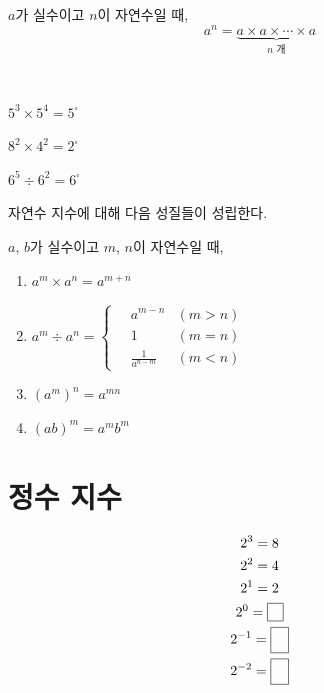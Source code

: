 \documentclass{oblivoir}
\begin{document}
\begin{mdframed}
%
\label{natural2}
\(a\)가 실수이고 \(n\)이 자연수일 때,
\[a^n=\underbrace{a\times a\times\cdots\times a}_\text{$n$ 개}\]
\end{mdframed}

%
\label{natural3}
\\[-10pt]
\begin{enumerate*}[itemjoin=\hspace{0.15\textwidth}]
\item
\(5^3\times5^4=5^\square\)
\item
\(8^2\times4^2=2^\square\)
\item
\(6^5\div6^2=6^\square\)
\end{enumerate*}

\bigskip\noindent
자연수 지수에 대해 다음 성질들이 성립한다.
%
\begin{mdframed}
\label{natural4}
\(a\), \(b\)가 실수이고 \(m\), \(n\)이 자연수일 때,
\begin{enumerate}
\item
\(a^m\times a^n=a^{m+n}\)
\item
\(\displaystyle a^m\div a^n=
\begin{cases}
\quad	a^{m-n}		&(m>n)\\
\quad	1			&(m=n)\\
\quad	\frac1{a^{n-m}}&(m<n)
\end{cases}
\)
\item
\((a^m)^n=a^{mn}\)
\item
\((ab)^m=a^mb^m\)
\end{enumerate}
\end{mdframed}

\newpage

\section{정수 지수}
%
\label{integer1}
\vspace{-20pt}
\begin{gather*}
2^3		=8\\
2^2		=4\\
2^1		=2\\
2^0		=\pb{0}\\
2^{-1}	=\pb{\frac12}\\
2^{-2}	=\pb{\frac14}
\end{gather*}
\end{document}
